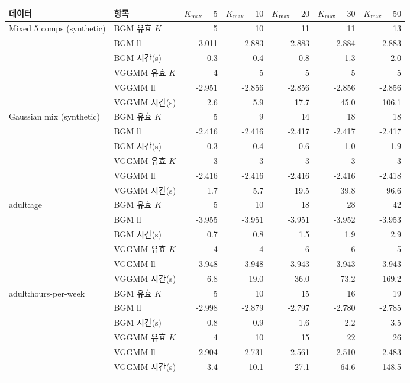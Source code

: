\begin{tabular}{llrrrrr}
\toprule
데이터 & 항목 & $K_{\max}=5$ & $K_{\max}=10$ & $K_{\max}=20$ & $K_{\max}=30$ & $K_{\max}=50$ \\
\midrule
Mixed 5 comps (synthetic) & BGM 유효 $K$ & 5 & 10 & 11 & 11 & 13 \\
 & BGM ll & -3.011 & -2.883 & -2.883 & -2.884 & -2.883 \\
 & BGM 시간(s) & 0.3 & 0.4 & 0.8 & 1.3 & 2.0 \\
 & VGGMM 유효 $K$ & 4 & 5 & 5 & 5 & 5 \\
 & VGGMM ll & -2.951 & -2.856 & -2.856 & -2.856 & -2.856 \\
 & VGGMM 시간(s) & 2.6 & 5.9 & 17.7 & 45.0 & 106.1 \\
\addlinespace
Gaussian mix (synthetic) & BGM 유효 $K$ & 5 & 9 & 14 & 18 & 18 \\
 & BGM ll & -2.416 & -2.416 & -2.417 & -2.417 & -2.417 \\
 & BGM 시간(s) & 0.3 & 0.4 & 0.6 & 1.0 & 1.9 \\
 & VGGMM 유효 $K$ & 3 & 3 & 3 & 3 & 3 \\
 & VGGMM ll & -2.416 & -2.416 & -2.416 & -2.416 & -2.418 \\
 & VGGMM 시간(s) & 1.7 & 5.7 & 19.5 & 39.8 & 96.6 \\
\addlinespace
adult:age & BGM 유효 $K$ & 5 & 10 & 18 & 28 & 42 \\
 & BGM ll & -3.955 & -3.951 & -3.951 & -3.952 & -3.953 \\
 & BGM 시간(s) & 0.7 & 0.8 & 1.5 & 1.9 & 2.9 \\
 & VGGMM 유효 $K$ & 4 & 4 & 6 & 6 & 5 \\
 & VGGMM ll & -3.948 & -3.948 & -3.943 & -3.943 & -3.943 \\
 & VGGMM 시간(s) & 6.8 & 19.0 & 36.0 & 73.2 & 169.2 \\
\addlinespace
adult:hours-per-week & BGM 유효 $K$ & 5 & 10 & 15 & 16 & 19 \\
 & BGM ll & -2.998 & -2.879 & -2.797 & -2.780 & -2.785 \\
 & BGM 시간(s) & 0.8 & 0.9 & 1.6 & 2.2 & 3.5 \\
 & VGGMM 유효 $K$ & 4 & 10 & 15 & 22 & 26 \\
 & VGGMM ll & -2.904 & -2.731 & -2.561 & -2.510 & -2.483 \\
 & VGGMM 시간(s) & 3.4 & 10.1 & 27.1 & 64.6 & 148.5 \\
\addlinespace
\bottomrule
\end{tabular}